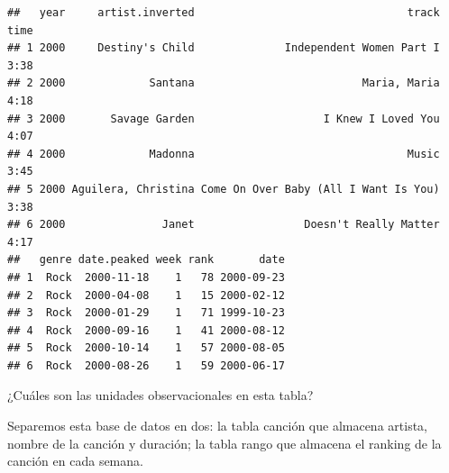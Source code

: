 \documentclass[]{article}
\newenvironment{Shaded}{\begin{snugshade}}{\end{snugshade}}
\newcommand{\KeywordTok}[1]{\textcolor[rgb]{0.13,0.29,0.53}{\textbf{{#1}}}}
\newcommand{\DataTypeTok}[1]{\textcolor[rgb]{0.13,0.29,0.53}{{#1}}}
\newcommand{\DecValTok}[1]{\textcolor[rgb]{0.00,0.00,0.81}{{#1}}}
\newcommand{\StringTok}[1]{\textcolor[rgb]{0.31,0.60,0.02}{{#1}}}
\newcommand{\OtherTok}[1]{\textcolor[rgb]{0.56,0.35,0.01}{{#1}}}
\newcommand{\NormalTok}[1]{{#1}}
\begin{document}
\begin{Shaded}
\end{Shaded}

\begin{verbatim}
##   year     artist.inverted                                 track time
## 1 2000     Destiny's Child              Independent Women Part I 3:38
## 2 2000             Santana                          Maria, Maria 4:18
## 3 2000       Savage Garden                    I Knew I Loved You 4:07
## 4 2000             Madonna                                 Music 3:45
## 5 2000 Aguilera, Christina Come On Over Baby (All I Want Is You) 3:38
## 6 2000               Janet                 Doesn't Really Matter 4:17
##   genre date.peaked week rank       date
## 1  Rock  2000-11-18    1   78 2000-09-23
## 2  Rock  2000-04-08    1   15 2000-02-12
## 3  Rock  2000-01-29    1   71 1999-10-23
## 4  Rock  2000-09-16    1   41 2000-08-12
## 5  Rock  2000-10-14    1   57 2000-08-05
## 6  Rock  2000-08-26    1   59 2000-06-17
\end{verbatim}

¿Cuáles son las unidades observacionales en esta tabla?

Separemos esta base de datos en dos: la tabla canción que almacena
artista, nombre de la canción y duración; la tabla rango que almacena el
ranking de la canción en cada semana.

\begin{Shaded}
\end{Shaded}
\end{document}
